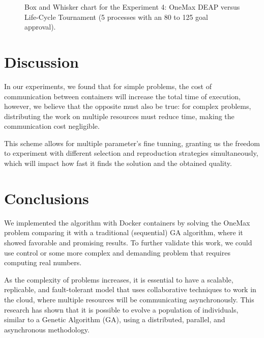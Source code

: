 \documentclass[runningheads]{llncs}
\begin{document}
\begin{figure}
    \caption{Box and Whisker chart for the Experiment 4: OneMax DEAP versus Life-Cycle Tournament (5 processes with an 80 to 125 goal approval).} \label{fig9}
    \end{figure}



\section{Discussion}

In our experiments, we found that for simple problems, the cost of
communication between containers will increase the total time of execution,
however, we believe that the opposite must also be true: for complex problems,
distributing the work on multiple resources must reduce time, making the
communication cost negligible.

This scheme allows for multiple parameter's fine tunning, granting us the
freedom to experiment with different selection and reproduction strategies
simultaneously, which will impact how fast it finds the solution and the
obtained quality.

\section{Conclusions}

We implemented the algorithm with Docker containers by solving the OneMax
problem comparing it with a traditional (sequential) GA algorithm, where it
showed favorable and promising results. To further validate this work, we could
use control or some more complex and demanding problem that requires computing
real numbers.

As the complexity of problems increases, it is essential to have a scalable,
replicable, and fault-tolerant model that uses collaborative techniques to work
in the cloud, where multiple resources will be communicating asynchronously.
This research has shown that it is possible to evolve a population of
individuals, similar to a Genetic Algorithm (GA), using a distributed,
parallel, and asynchronous methodology.
\end{document}
